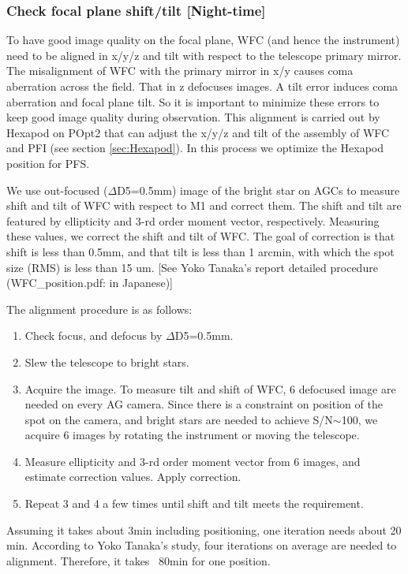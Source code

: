 \subsubsection{Check focal plane shift/tilt [Night-time]}\label{secflow:WFCTiltShift}

To have good image quality on the focal plane, WFC (and hence the instrument) need to be aligned in x/y/z and tilt with respect to the telescope primary mirror.
The misalignment of WFC with the primary mirror in x/y causes coma aberration across the field.
That in z defocuses images.
A tilt error induces coma aberration and focal plane tilt.
So it is important to minimize these errors to keep good image quality during observation. 
This alignment is carried out by Hexapod on POpt2 that can adjust the x/y/z and tilt of the assembly of WFC and PFI (see section \ref{sec:Hexapod}).
In this process we optimize the Hexapod position for PFS.

We use out-focused ($\Delta$D5=0.5mm) image of the bright star on AGCs to measure shift and tilt of WFC with respect to M1 and correct them.
The shift and tilt are featured by ellipticity and 3-rd order moment vector, respectively.
Measuring these values, we correct the shift and tilt of WFC.
The goal of correction is that shift is less than 0.5mm, and that tilt is less than 1 arcmin, with which the spot size (RMS) is less than 15 um.
[See Yoko Tanaka's report detailed procedure (WFC\_position.pdf: in Japanese)]

The alignment procedure is as follows:
\begin{enumerate}
\item Check focus, and defocus by $\Delta$D5=0.5mm.
\item Slew the telescope to bright stars.
\item Acquire the image.
To measure tilt and shift of WFC, 6 defocused image are needed on every AG camera.
Since there is a constraint on position of the spot on the camera, and bright stars are needed to achieve S/N$\sim$100, we acquire 6 images by rotating the instrument or moving the telescope.
\item Measure ellipticity and 3-rd order moment vector from 6 images, and estimate correction values.
Apply correction.
\item Repeat 3 and 4 a few times until shift and tilt meets the requirement.
\end{enumerate}

Assuming it takes about 3min including positioning, one iteration needs about 20 min.
According to Yoko Tanaka's study, four iterations on average are needed to alignment.
Therefore, it takes ~80min for one position.

